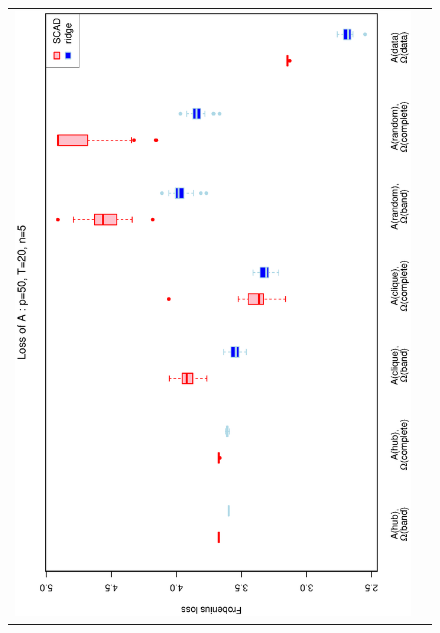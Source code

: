 \documentclass[a4paper]{article}
\begin{document}
\begin{figure}[h!]
\centering
\begin{tabular}{cc}
\includegraphics[scale=0.45,angle=270]{LossA50T20N5_5.eps}
\\

\end{tabular}
\end{figure}
\end{document}
